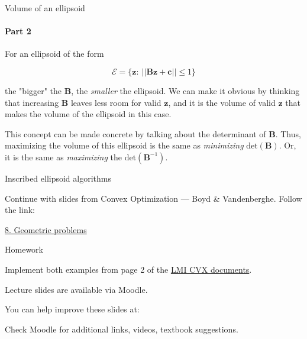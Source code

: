 \documentclass{beamer}
\begin{document}
\begin{frame}{Volume of an ellipsoid}
\framesubtitle{Part 2}
\begin{flushleft}

For an ellipsoid of the form

\begin{equation}
    \mathcal{E} = \{ \mathbf{z}: \ || \mathbf{B}\mathbf{z} + \mathbf{c} || \leq 1 \}
\end{equation}

the "bigger" the $\mathbf{B}$, the \emph{smaller} the ellipsoid. We can make it obvious by thinking that increasing $\mathbf{B}$ leaves less room for valid $\mathbf{z}$, and it is the volume of valid $\mathbf{z}$ that makes the volume of the ellipsoid in this case.

\bigskip

This concept can be made concrete by talking about the determinant of $\mathbf{B}$. Thus, maximizing the volume of this ellipsoid is the same as \emph{minimizing} $\text{det}(\mathbf{B})$. Or, it is the same as \emph{maximizing} the $\text{det}(\mathbf{B}^{-1})$.
 
\end{flushleft}
\end{frame}



\begin{frame}{Inscribed ellipsoid algorithms}
\begin{flushleft}

Continue with slides from Convex Optimization — Boyd \& Vandenberghe. Follow the link:

\bigskip

\centerline{\href{https://see.stanford.edu/materials/lsocoee364a/08GeometricalProbs.pdf}{8. Geometric problems}}

\end{flushleft}
\end{frame}



\begin{frame}{Homework}
\begin{flushleft}


Implement both examples from page 2 of the \href{http://stanford.edu/class/ee363/notes/lmi-cvx.pdf}{LMI CVX documents}.

\end{flushleft}
\end{frame}





\begin{frame}
	\centerline{Lecture slides are available via Moodle.}
	\bigskip
	\centerline{You can help improve these slides at:}
	\centerline{
		\mygit
	}
	\bigskip
	
	\textcolor{black}{}
	\bigskip
	
	
	\centerline{Check Moodle for additional links, videos, textbook suggestions.}
\end{frame}
\end{document}
